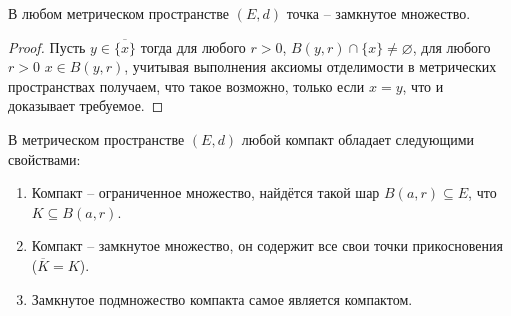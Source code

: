 \begin{corollary}\label{point_is_closed}
    В любом метрическом пространстве $(E,d)$ точка -- замкнутое множество.
\end{corollary}

\begin{proof}
    Пусть $y \in \overline{\{x\}}$ тогда для любого $r>0$, $B(y,r) \cap \{x\} \ne \varnothing$, \ie для любого $r >0$ $x \in B(y,r)$, учитывая выполнения аксиомы отделимости в метрических пространствах получаем, что такое возможно, только если $x =y$, что и доказывает требуемое.
\end{proof}


\begin{theorem}\label{properties_of_compact}
 В метрическом пространстве $(E,d)$ любой компакт обладает следующими свойствами:
  \begin{enumerate}
      \item Компакт -- ограниченное множество, \ie найдётся такой шар $B(a,r) \subseteq E$, что $K \subseteq B(a,r)$.
      \item Компакт -- замкнутое множество, \ie он содержит все свои точки прикосновения ($\overline{K} = K$).
      \item Замкнутое подмножество компакта самое является компактом.
  \end{enumerate} 
\end{theorem}

